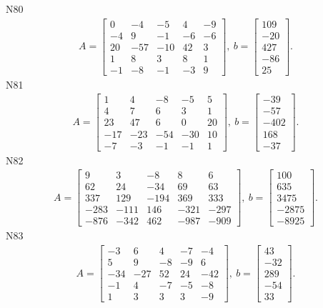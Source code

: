 \documentclass[11pt]{report}
\begin{document}
N80
\begin{align*}
 A = \left[\begin{matrix}0 & -4 & -5 & 4 & -9\\-4 & 9 & -1 & -6 & -6\\20 & -57 & -10 & 42 & 3\\1 & 8 & 3 & 8 & 1\\-1 & -8 & -1 & -3 & 9\end{matrix}\right],
\ b = \left[\begin{matrix}109\\-20\\427\\-86\\25\end{matrix}\right]. 
 \end{align*}
N81
\begin{align*}
 A = \left[\begin{matrix}1 & 4 & -8 & -5 & 5\\4 & 7 & 6 & 3 & 1\\23 & 47 & 6 & 0 & 20\\-17 & -23 & -54 & -30 & 10\\-7 & -3 & -1 & -1 & 1\end{matrix}\right],
\ b = \left[\begin{matrix}-39\\-57\\-402\\168\\-37\end{matrix}\right]. 
 \end{align*}
N82
\begin{align*}
 A = \left[\begin{matrix}9 & 3 & -8 & 8 & 6\\62 & 24 & -34 & 69 & 63\\337 & 129 & -194 & 369 & 333\\-283 & -111 & 146 & -321 & -297\\-876 & -342 & 462 & -987 & -909\end{matrix}\right],
\ b = \left[\begin{matrix}100\\635\\3475\\-2875\\-8925\end{matrix}\right]. 
 \end{align*}
N83
\begin{align*}
 A = \left[\begin{matrix}-3 & 6 & 4 & -7 & -4\\5 & 9 & -8 & -9 & 6\\-34 & -27 & 52 & 24 & -42\\-1 & 4 & -7 & -5 & -8\\1 & 3 & 3 & 3 & -9\end{matrix}\right],
\ b = \left[\begin{matrix}43\\-32\\289\\-54\\33\end{matrix}\right]. 
 \end{align*}
\end{document}
